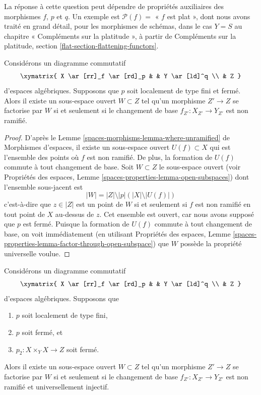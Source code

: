 \medskip\noindent
La réponse à cette question peut dépendre de propriétés auxiliaires des
morphismes $f$, $p$ et $q$. Un exemple est $\mathcal{P}(f) =$ « $f$ est plat »,
dont nous avons traité en grand détail, pour les morphismes de schémas, dans le cas $Y = S$ au
chapitre « Compléments sur la platitude », à partir de
Compléments sur la platitude, section \ref{flat-section-flattening-functors}.

\begin{lemma}
\label{lemma-where-unramified}
Considérons un diagramme commutatif
$$
\xymatrix{
X \ar[rr]_f \ar[rd]_p & & Y \ar[ld]^q \\
& Z
}
$$
d'espaces algébriques. Supposons que $p$ soit localement de type fini et fermé.
Alors il existe un sous-espace ouvert $W \subset Z$
tel qu'un morphisme $Z' \to Z$ se factorise par $W$ si et seulement si le
changement de base $f_{Z'} : X_{Z'} \to Y_{Z'}$ est non ramifié.
\end{lemma}

\begin{proof}
D'après le
Lemme \ref{spaces-morphisms-lemma-where-unramified} de Morphismes d'espaces,
il existe un sous-espace ouvert $U(f) \subset X$ qui est l'ensemble des
points où $f$ est non ramifié. De plus, la formation de $U(f)$ commute
à tout changement de base. Soit $W \subset Z$ le sous-espace ouvert
(voir
Propriétés des espaces, Lemme
\ref{spaces-properties-lemma-open-subspaces})
dont l'ensemble sous-jacent est
$$
|W| = |Z| \setminus |p|\left(|X| \setminus |U(f)|\right)
$$
c'est-à-dire que $z \in |Z|$ est un point de $W$ si et seulement si $f$ est non ramifié
en tout point de $X$ au-dessus de $z$. Cet ensemble est ouvert, car nous
avons supposé que $p$ est fermé. Puisque la formation de $U(f)$
commute à tout changement de base, on voit immédiatement (en utilisant
Propriétés des espaces, Lemme
\ref{spaces-properties-lemma-factor-through-open-subspace})
que $W$ possède la propriété universelle voulue.
\end{proof}

\begin{lemma}
\label{lemma-where-unramified-universally-injective}
Considérons un diagramme commutatif
$$
\xymatrix{
X \ar[rr]_f \ar[rd]_p & & Y \ar[ld]^q \\
& Z
}
$$
d'espaces algébriques. Supposons que
\begin{enumerate}
\item $p$ soit localement de type fini,
\item $p$ soit fermé, et
\item $p_2 : X \times_Y X \to Z$ soit fermé.
\end{enumerate}
Alors il existe un sous-espace ouvert $W \subset Z$
tel qu'un morphisme $Z' \to Z$ se factorise par $W$ si et seulement si le
changement de base $f_{Z'} : X_{Z'} \to Y_{Z'}$ est non ramifié et universellement
injectif.
\end{lemma}

